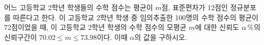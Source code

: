 어느 고등학교 2학년 학생들의 수학 점수는 평균이 $m$점, 표준편차가 12점인 정규분포를 따른다고 한다. 이 고등학교 2학년 학생 중 임의추출한 100명의 수학 점수의 평균이 72점이었을 때, 이 고등학교 2학년 학생의 수학 점수의 모평균 $m$에 대한 신뢰도 $\alpha\mkern3mu \%$의 신뢰구간이 $70.02\le m\le 73.98$이다. 이때 $\alpha$의 값을 구하시오. 

